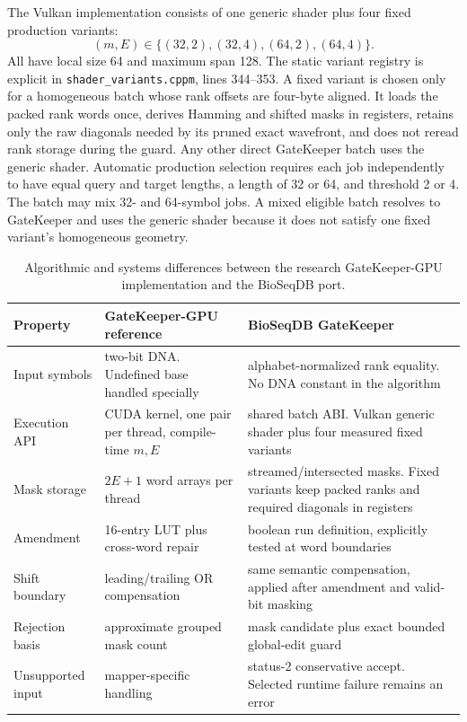 The Vulkan implementation consists of one generic shader plus four fixed
production variants:
\[
 (m,E)\in\{(32,2),(32,4),(64,2),(64,4)\}.
\]
All have local size 64 and maximum span 128.  The static variant registry is
explicit in \texttt{shader\_variants.cppm}, lines 344--353.  A fixed variant is
chosen only for a homogeneous batch whose rank offsets are four-byte aligned.
It loads the packed rank words once, derives Hamming and shifted masks in
registers, retains only the raw diagonals needed by its pruned exact
wavefront, and does not reread rank storage during the guard.  Any other direct
GateKeeper batch uses the generic shader.  Automatic production selection
requires each job independently to have equal query and target lengths, a
length of 32 or 64, and threshold 2 or 4.  The batch may mix 32- and 64-symbol
jobs.  A mixed eligible batch resolves to GateKeeper and uses the generic
shader because it does not satisfy one fixed variant's homogeneous geometry.

\begin{table}[htbp]
\centering
\small
\begin{tabular}{p{}p{}p{}}
\textbf{Property} & \textbf{GateKeeper-GPU reference} & \textbf{BioSeqDB GateKeeper}\\
\hline
Input symbols & two-bit DNA. Undefined base handled specially &
alphabet-normalized rank equality. No DNA constant in the algorithm\\
Execution API & CUDA kernel, one pair per thread, compile-time \(m,E\) &
shared batch ABI. Vulkan generic shader plus four measured fixed variants\\
Mask storage & \(2E+1\) word arrays per thread &
streamed/intersected masks. Fixed variants keep packed ranks and required
diagonals in registers\\
Amendment & 16-entry LUT plus cross-word repair &
boolean run definition, explicitly tested at word boundaries\\
Shift boundary & leading/trailing OR compensation &
same semantic compensation, applied after amendment and valid-bit masking\\
Rejection basis & approximate grouped mask count &
mask candidate plus exact bounded global-edit guard\\
Unsupported input & mapper-specific handling &
status-2 conservative accept. Selected runtime failure remains an error\\
\end{tabular}
\caption{Algorithmic and systems differences between the research
GateKeeper-GPU implementation and the BioSeqDB port.}
\label{tab:gatekeeper-differences}
\end{table}

